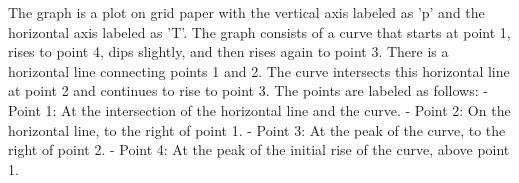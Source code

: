 The graph is a plot on grid paper with the vertical axis labeled as 'p' and the horizontal axis labeled as 'T'. The graph consists of a curve that starts at point 1, rises to point 4, dips slightly, and then rises again to point 3. There is a horizontal line connecting points 1 and 2. The curve intersects this horizontal line at point 2 and continues to rise to point 3. The points are labeled as follows:
- Point 1: At the intersection of the horizontal line and the curve.
- Point 2: On the horizontal line, to the right of point 1.
- Point 3: At the peak of the curve, to the right of point 2.
- Point 4: At the peak of the initial rise of the curve, above point 1.